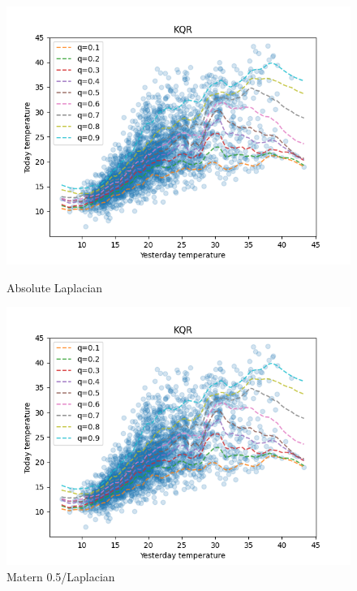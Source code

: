 \begin{figure}[!htp] 
    \begin{minipage}[b]{0.5\linewidth}
      \centering
      \includegraphics[width=1.0\textwidth]{images/melbourne_a_laplacian_kernel_quantile_regression.png} 
        \caption{Absolute Laplacian} 
      \vspace{4ex}
    \end{minipage}%
    \begin{minipage}[b]{0.5\linewidth}
      \centering
      \includegraphics[width=1.0\textwidth]{images/melbourne_matern_0.5_kernel_quantile_regression.png} 
        \caption{Matern 0.5/Laplacian}  
      \vspace{4ex}
    \end{minipage} 

\end{figure}
